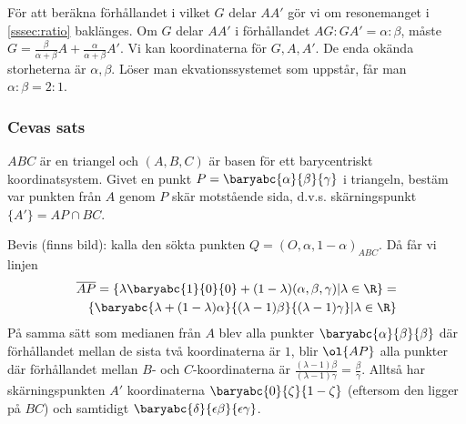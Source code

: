 För att beräkna förhållandet i vilket $G$ delar $AA'$ gör vi om resonemanget i
\ref{sssec:ratio} baklänges.
Om $G$ delar $AA'$ i förhållandet $AG : GA' = \alpha : \beta$, måste
$G = \frac{\beta}{\alpha+\beta} A + \frac{\alpha}{\alpha + \beta}A'$.
Vi kan koordinaterna för $G, A, A'$. De enda okända storheterna är $\alpha, \beta$.
Löser man ekvationssystemet som uppstår, får man $\alpha : \beta = 2 : 1$.

\subsubsection{Cevas sats}
$ABC$ är en triangel och $(A,B,C)$ är basen för ett barycentriskt koordinatsystem.
Givet en punkt $P=\baryabc{\alpha}{\beta}{\gamma}$
i triangeln, bestäm var punkten från $A$ genom $P$ skär motstående sida, 
d.v.s. skärningspunkt $\{A'\} = AP \cap BC$.

Bevis (finns bild): kalla den sökta punkten $Q = (O, \alpha, 1-\alpha)_{ABC}$. Då får vi linjen 
\begin{eqnarray*}
\overline{AP} = \{\lambda \baryabc{1}{0}{0} + (1 - \lambda)(\alpha, \beta, \gamma) | \lambda \in \R\}  = \\
\{
    \baryabc{\lambda + (1-\lambda)\alpha} {(\lambda-1)\beta} {(\lambda-1)\gamma} | \lambda \in \R
\}
\end{eqnarray*}
På samma sätt som medianen från $A$ blev alla punkter $\baryabc{\alpha}{\beta}{\beta}$
där förhållandet mellan de sista två koordinaterna är $1$, blir 
$\ol{AP}$ alla punkter där förhållandet mellan $B$- och $C$-koordinaterna är
$\frac{(\lambda-1)\beta} {(\lambda-1)\gamma} = \frac{\beta}{\gamma}$.
Alltså har skärningspunkten $A'$ koordinaterna 
$\baryabc{0}{\zeta}{1 - \zeta}$ (eftersom den ligger på $BC$) och samtidigt
$\baryabc{\delta} {\epsilon\beta} {\epsilon\gamma}$.
{}







